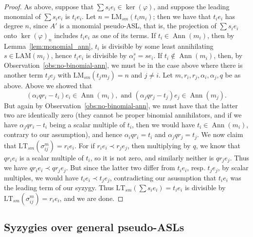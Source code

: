\documentclass[11pt,reqno]{amsart}
\DeclareMathOperator{\Ann}{Ann}
\newcommand{\lmsm}{\text{LM}_{sm}}
\newcommand{\ltsm}{\text{LT}_{sm}}
\newcommand{\LAM}{\ensuremath{\text{LAM}}}
\theoremstyle{definition}
\numberwithin{equation}{section}
\begin{document}
\begin{proof}
As above, suppose that $\sum s_i e_i \in \ker(\varphi)$, and suppose the leading monomial of $\sum s_i e_i$ is $t_i e_i$. Let $n = \lmsm(t_i m_i)$; then we have that $t_i e_i$ has degree $n$, since $A'$ is a monomial pseudo-ASL, that is, the projection of $\sum s_i e_i$ onto $\ker(\varphi)_n$ includes $t_i e_i$ as one of its terms. If $t_i \in \Ann(m_i)$, then by Lemma~\ref{lem:monomial_ann}, $t_i$ is divisible by some least annihilating $s \in \LAM(m_i)$, hence $t_i e_i$ is divisible by $\alpha_i^s = s e_i$. If $t_i \notin \Ann(m_i)$, then, by Observation~\ref{obs:no-binomial-ann}, we must be in the case above where there is another term $t_j e_j$ with $\lmsm(t_j m_j) = n$ and $j \neq i$. Let $m, r_i, r_j, \alpha_i, \alpha_j, q$ be as above. Above we showed that 
\[
(\alpha_i q r_i - t_i) e_i \in \Ann(m_i), \text{ and } (\alpha_j q r_j - t_j) e_j \in \Ann(m_j).
\]
But again by Observation~\ref{obs:no-binomial-ann}, we must have that the latter two are identically zero (they cannot be proper binomial annihilators, and if we have $\alpha_j q r_i - t_i$ being a scalar multiple of $t_i$, then we would have $t_i \in \Ann(m_i)$, contrary to our assumption), and hence $\alpha_i q r_i = t_i$ and $\alpha_j q r_j = t_j$. We now claim that $\ltsm(\sigma_{ij}^m) = r_i e_i$. For if $r_i e_i \prec r_j e_j$, then multiplying by $q$, we know that $q r_i e_i$ is a scalar multiple of $t_i$, so it is not zero, and similarly neither is $q r_j e_j$. Thus we have $q r_i e_i \prec q r_j e_j$. But since the latter two differ from $t_i e_i$, resp. $t_j e_j$, by scalar multiples, we would have $t_i e_i \prec t_j e_j$, contradicting our asusmption that $t_i e_i$ was the leading term of our syzygy. Thus $\ltsm(\sum s_i e_i) = t_i e_i$ is divisible by $\ltsm(\sigma_{ij}^m) = r_i e_i$, and we are done.
\end{proof}

\subsection{Syzygies over general pseudo-ASLs} 
\end{document}
